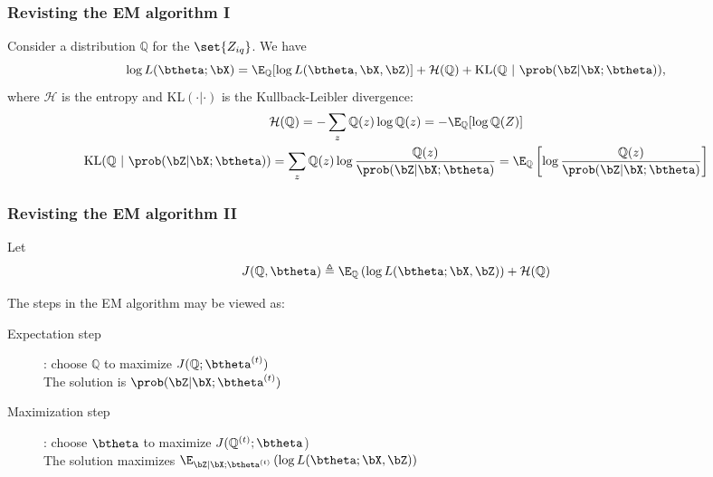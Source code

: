 \documentclass{beamer}\usepackage[]{graphicx}\usepackage[]{color}
\begin{document}
\begin{frame}
  \frametitle{Revisting the EM algorithm I}

  \begin{proposition}
    Consider a distribution $\mathbb{Q}$ for the $\set{Z_{iq}}$. We have
    \begin{equation*}
      \log L(\btheta; \bX) = \E_{\mathbb{Q}} [\log L(\btheta, \bX,\bZ)] + \mathcal{H}(\mathbb{Q}) + \mathrm{KL}(\mathbb{Q} \ | \ \prob(\bZ|\bX;\btheta)),
    \end{equation*}
    where $\mathcal{H}$ is the entropy and $\mathrm{KL}( \cdot| \cdot)$ is the Kullback-Leibler divergence:
    \begin{gather*}
      \mathcal{H}(\mathbb{Q}) = - \sum_z \mathbb{Q}(z) \log \mathbb{Q}(z) = - \E_\mathbb{Q} [\log \mathbb{Q} (Z)]\\
      \mathrm{KL}(\mathbb{Q} \ | \ \prob(\bZ|\bX;\btheta)) = \sum_z \mathbb{Q}(z) \log \frac{\mathbb{Q}(z)}{\prob(\bZ|\bX;\btheta)} = \E_\mathbb{Q} \left[\log \frac{\mathbb{Q}(z)}{\prob(\bZ|\bX;\btheta)}\right]\\
    \end{gather*}
  \end{proposition}
\end{frame}

\begin{frame}
  \frametitle{Revisting the EM algorithm II}
  Let
   \begin{equation*}
    J(\mathbb{Q},\btheta) \triangleq \E_{\mathbb{Q}}\left(\log L(\btheta ;\bX,\bZ)\right) + \mathcal{H}(\mathbb{Q})
\end{equation*}

  \vfill

  The steps in the EM algorithm may be viewed as:
  \begin{description}
    \item[Expectation step]: choose $\mathbb{Q}$ to maximize $J(\mathbb{Q};\btheta^{(t)})$\\[2ex]
      \alert{The solution is $\prob(\bZ|\bX;\btheta^{(t)})$}\\
    \item[Maximization step]: choose $\btheta$ to maximize $J(\mathbb{Q}^{(t)};\btheta$)\\[2ex]
      \alert{The solution maximizes $\E_{\bZ|\bX;\btheta^{(t)}}\left(\log L(\btheta ;\bX,\bZ)\right)$}
  \end{description}

\end{frame}
\end{document}
